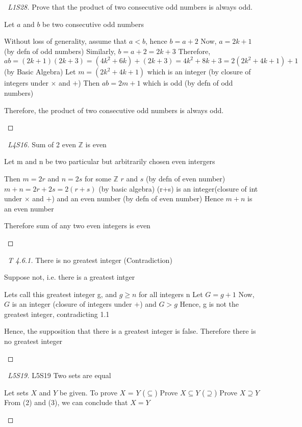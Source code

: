 \documentclass[a4paper]{article}
\theoremstyle{definition}
\begin{document}
\begin{proof} [\proofname\ L1S28]
Prove that the product of two consecutive odd numbers is always odd. 
\begin{numpf*}
  \pfln Let $a$ and $b$ be two consecutive odd numbers
  \begin{subpf*}
    \pfln Without loss of generality, assume that $a < b$, hence $b = a + 2$
    \pfln Now, $a = 2k+1$ (by defn of odd numbers)
    \pfln Similarly, $b = a + 2 = 2k + 3$
    \pfln Therefore, $ab = (2k+1)(2k+3) = (4k^2 + 6k) + (2k + 3) = 4k^2 + 8k + 3 = 2(2k^2 + 4k + 1) + 1$ (by Basic Algebra)
    \pfln Let $m = (2k^2 + 4k + 1)$ which is an integer (by closure of integers under $\times$ and $+$)
    \pfln Then $ab = 2m + 1$ which is odd (by defn of odd numbers)
  \end{subpf*}
  \pfln Therefore, the product of two consecutive odd numbers is always odd.
\end{numpf*}
\end{proof}

\begin{proof}[\proofname\ L4S16] Sum of 2 even $\mathbb{Z}$ is even
  \begin{numpf*}
  \pfln Let m and n be two particular but arbitrarily chosen even intergers
  \begin{subpf*}
    \pfln Then $m = 2r$ and $n = 2s$ for some $\mathbb{Z}$ $r$ and $s$ (by defn of even number)
    \pfln $m + n = 2r + 2s = 2(r+s)$ (by basic algebra)
    (r+s) is an integer(closure of int under $\times$ and $+$) and an even number (by defn of even number)
    \pfln Hence $m+n$ is an even number
  \end{subpf*}
  \pfln Therefore sum of any two even integers is even
  \end{numpf*}
\end{proof}

\begin{proof}[\proofname\ T 4.6.1] There is no greatest integer (Contradiction)
  \begin{numpf*}
    \pfln Suppose not, i.e. there is a greatest intger
    \begin{subpf*}
      \pfln Lets call this greatest integer g, and $g \geq n$ for all integers n
      \pfln Let $G = g + 1$
      \pfln Now, $G$ is an integer (closure of integers under $+$) and $G > g$
      \pfln Hence, g is not the greatest integer, contradicting 1.1
    \end{subpf*}
    \pfln Hence, the supposition that there is a greatest integer is false.
    \pfln Therefore there is no greatest integer
  \end{numpf*}
\end{proof}
\begin{proof}[\proofname\ L5S19] L5S19 Two sets are equal
  \begin{numpf*}
    \pfln Let sets $X$ and $Y$ be given. To prove $X$ = $Y$
    \pfln ($\subseteq$) Prove $X \subseteq Y$
    \pfln ($\supseteq$) Prove $X \supseteq Y$
    \pfln From (2) and (3), we can conclude that $X = Y$
  \end{numpf*}
\end{proof}
\end{document}
